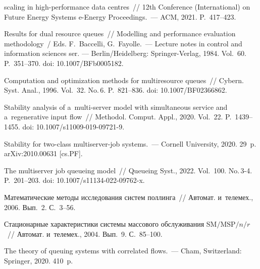 \begin{multicols}{2}
{{\begin{thebibliography}{99}
 \columnbreak
 
 \noindent
  scaling in high-performance data centres~// 
 12th Conference (International) on Future Energy 
Systems e-Energy Proceedings.~--- ACM, 2021. P.~417--423.

Results for dual resource queues~// Modelling and performance evaluation methodology~/
Eds. F.~Baccelli, G.~Fayolle.~--- Lecture notes in control and information sciences ser. --- 
Berlin/Heidelberg: Springer-Verlag, 1984.  Vol.~60.
P.~351--370. doi: 10.1007/BFb0005182.

 Computation and optimization methods for multiresource 
queues~// Cybern.  Syst. Anal., 1996. Vol.~32. No.\,6. P.~821--836. doi: 
10.1007/BF02366862.


Stability analysis of a~multi-server model with simultaneous service and a~regenerative input flow~//
Methodol. Comput. Appl., 2020. Vol.~22. P.~1439--1455. doi: 
10.1007/s11009-019-09721-9.


Stability for two-class multiserver-job systems.~--- Cornell University,  2020. 29~p. \mbox{arXiv}:2010.00631 [cs.PF].

 The multiserver job queueing model~// Queueing Syst., 
2022. Vol.~100. No.\,3-4. P.~201--203. doi: 10.1007/s11134-022-09762-x.



 Математические методы исследования 
систем поллинга~// Автомат. и~телемех., 2006. Вып.~2. С.~3--56.


 Стационарные характеристики системы 
массового обслуживания ${\mathrm{SM}/\mathrm{MSP}/n/r}$~//
Автомат. и~телемех., 2004. Вып.~9. С.~85--100.

 The theory of queuing 
systems with correlated flows.~--- Cham, Switzerland: Springer, 2020. 410~p.



\end{thebibliography}}}
\end{multicols}
